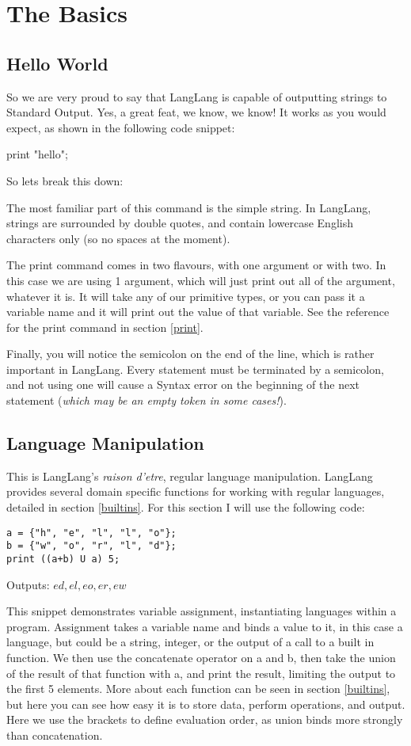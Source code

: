 \section{The Basics}
\subsection{Hello World}
\label{helloworld}
\begin{normalsize}
So we are very proud to say that LangLang is capable of outputting strings to Standard Output. Yes, a great feat, we know, we know! It works as you would expect, as shown in the following code snippet:

print "hello";

So lets break this down:

The most familiar part of this command is the simple string. In LangLang, strings are surrounded by double quotes, and contain lowercase English characters only (so no spaces at the moment).

The print command comes in two flavours, with one argument or with two. In this case we are using 1 argument, which will just print out all of the argument, whatever it is. It will take any of our primitive types, or you can pass it a variable name and it will print out the value of that variable. See the reference for the print command in section \ref{print}.

Finally, you will notice the semicolon on the end of the line, which is rather important in LangLang. Every statement must be terminated by a semicolon, and not using one will cause a Syntax error on the beginning of the next statement (\textit{which may be an empty token in some cases!}).
\end{normalsize}

\subsection{Language Manipulation}
\begin{normalsize}
This is LangLang's \textit{raison d'etre}, regular language manipulation. LangLang provides several domain specific functions for working with regular languages, detailed in section \ref{builtins}. For this section I will use the following code:
\begin{verbatim}
a = {"h", "e", "l", "l", "o"};
b = {"w", "o", "r", "l", "d"};
print ((a+b) U a) 5;
\end{verbatim}
Outputs: ${ed, el, eo, er, ew}$

This snippet demonstrates variable assignment, instantiating languages within a program. Assignment takes a variable name and binds a value to it, in this case a language, but could be a string, integer, or the output of a call to a built in function. We then use the concatenate operator on a and b, then take the union of the result of that function with a, and print the result, limiting the output to the first 5 elements. More about each function can be seen in section \ref{builtins}, but here you can see how easy it is to store data, perform operations, and output. Here we use the brackets to define evaluation order, as union binds more strongly than concatenation.
\end{normalsize}

